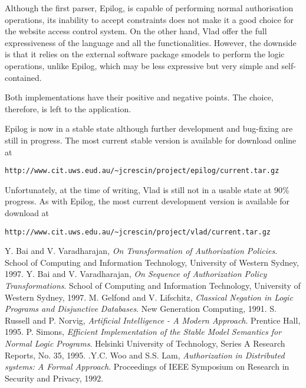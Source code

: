 \documentclass[a4paper]{article}
\begin{document}
    Although the first parser, Epilog, is capable of performing normal 
    authorisation operations, its inability to accept constraints does not
    make it a good choice for the website access control system. On the
    other hand, Vlad offer the full expressiveness of the language and all
    the functionalities. However, the downside is that it relies on the
    external software package smodels to perform the logic operations, unlike
    Epilog, which may be less expressive but very simple and self-contained.

    Both implementations have their positive and negative points. The choice,
    therefore, is left to the application.

    Epilog is now in a stable state although further development and
    bug-fixing are still in progress. The most current stable version 
    is available for download online at

    \begin{verbatim}
http://www.cit.uws.eud.au/~jcrescin/project/epilog/current.tar.gz
    \end{verbatim}

    Unfortunately, at the time of writing, Vlad is still not in a usable state
    at 90\% progress. As with Epilog, the most current development version is
    available for download at

    \begin{verbatim}
http://www.cit.uws.edu.au/~jcrescin/project/vlad/current.tar.gz
    \end{verbatim}

  \begin{thebibliography}{}
    Y. Bai and V. Varadharajan, \emph{On Transformation of Authorization Policies}. School of Computing and Information Technology, University of Western Sydney, 1997.
    Y. Bai and V. Varadharajan, \emph{On Sequence of Authorization Policy Transformations}. School of Computing and Information Technology, University of Western Sydney, 1997.
    M. Gelfond and V. Lifschitz, \emph{Classical Negation in Logic Programs and Disjunctive Databases}. New Generation Computing, 1991.
    S. Russell and P. Norvig, \emph{Artificial Intelligence - A Modern Approach}. Prentice Hall, 1995.
    P. Simons, \emph{Efficient Implementation of the Stable Model Semantics for Normal Logic Programs}. Helsinki University of Technology, Series A Research Reports, No. 35, 1995.
    .Y.C. Woo and S.S. Lam, \emph{Authorization in Distributed systems: A Formal Approach}. Proceedings of IEEE Symposium on Research in Security and Privacy, 1992.
  \end{thebibliography}
\end{document}
